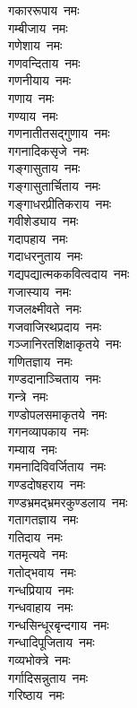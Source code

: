 \begin{flushleft}
\begin{multicols}{2}
गकाररूपाय~नमः\\
गम्बीजाय~नमः\\
गणेशाय~नमः\\
गणवन्दिताय~नमः\\
गणनीयाय~नमः\\
गणाय~नमः\\
गण्याय~नमः\\
गणनातीतसद्गुणाय~नमः\\
गगनादिकसृजे~नमः\\
गङ्गासुताय~नमः\hfill{}\\
गङ्गासुतार्चिताय~नमः\\
गङ्गाधरप्रीतिकराय~नमः\\
गवीशेड्याय~नमः\\
गदापहाय~नमः\\
गदाधरनुताय~नमः\\
गद्यपद्यात्मककवित्वदाय~नमः\\
गजास्याय~नमः\\
गजलक्ष्मीवते~नमः\\
गजवाजिरथप्रदाय~नमः\\
गञ्जानिरतशिक्षाकृतये~नमः\hfill{}\\
गणितज्ञाय~नमः\\
गण्डदानाञ्चिताय~नमः\\
गन्त्रे~नमः\\
गण्डोपलसमाकृतये~नमः\\
गगनव्यापकाय~नमः\\
गम्याय~नमः\\
गमनादिविवर्जिताय~नमः\\
गण्डदोषहराय~नमः\\
गण्डभ्रमद्भ्रमरकुण्डलाय~नमः\\
गतागतज्ञाय~नमः\hfill{}\\
गतिदाय~नमः\\
गतमृत्यवे~नमः\\
गतोद्भवाय~नमः\\
गन्धप्रियाय~नमः\\
गन्धवाहाय~नमः\\
गन्धसिन्धूरबृन्दगाय~नमः\\
गन्धादिपूजिताय~नमः\\
गव्यभोक्त्रे~नमः\\
गर्गादिसन्नुताय~नमः\\
गरिष्ठाय~नमः\hfill{}\\

\end{multicols}
\end{flushleft}
